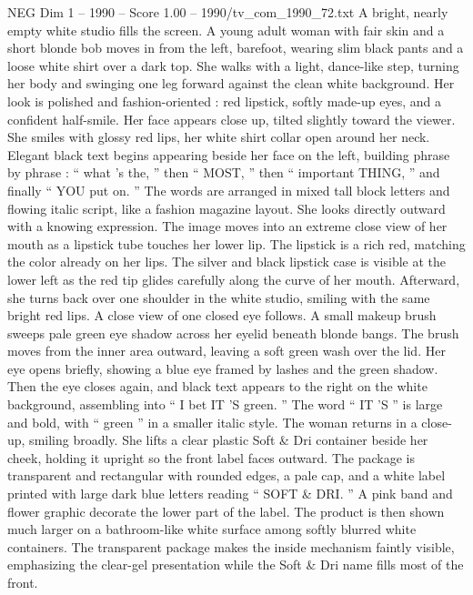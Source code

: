 \begin{textsample}{NEG Dim 1 – 1990 – Score 1.00 – 1990/tv\_com\_1990\_72.txt}  \label{ex:f1_neg_057}
A bright, nearly empty white studio fills the screen.
A young adult woman with fair skin and a short blonde bob moves in from the left, barefoot, wearing slim black pants and a loose white shirt over a dark top.
She walks with a light, dance-like step, turning her body and swinging one leg forward against the clean white background.
Her look is polished and fashion-oriented : red lipstick, softly made-up eyes, and a confident half-smile.
Her face appears close up, tilted slightly toward the viewer.
She smiles with glossy red lips, her white shirt collar open around her neck.
Elegant black text begins appearing beside her face on the left, building phrase by phrase : “ what ’s the, ” then “ MOST, ” then “ important THING, ” and finally “ YOU put on. ” The words are arranged in mixed tall block letters and flowing italic script, like a fashion magazine layout.
She looks directly outward with a knowing expression.
The image moves into an extreme close view of her mouth as a lipstick tube touches her lower lip.
The lipstick is a rich red, matching the color already on her lips.
The silver and black lipstick case is visible at the lower left as the red tip glides carefully along the curve of her mouth.
Afterward, she turns back over one shoulder in the white studio, smiling with the same bright red lips.
A close view of one closed eye follows.
A small makeup brush sweeps pale green eye shadow across her eyelid beneath blonde bangs.
The brush moves from the inner area outward, leaving a soft green wash over the lid.
Her eye opens briefly, showing a blue eye framed by lashes and the green shadow.
Then the eye closes again, and black text appears to the right on the white background, assembling into “ I bet IT ’S green. ” The word “ IT ’S ” is large and bold, with “ green ” in a smaller italic style.
The woman returns in a close-up, smiling broadly.
She lifts a clear plastic Soft \& Dri container beside her cheek, holding it upright so the front label faces outward.
The package is transparent and rectangular with rounded edges, a pale cap, and a white label printed with large dark blue letters reading “ SOFT \& DRI. ” A pink band and flower graphic decorate the lower part of the label.
The product is then shown much larger on a bathroom-like white surface among softly blurred white containers.
The transparent package makes the inside mechanism faintly visible, emphasizing the clear-gel presentation while the Soft \& Dri name fills most of the front.

\end{textsample}
